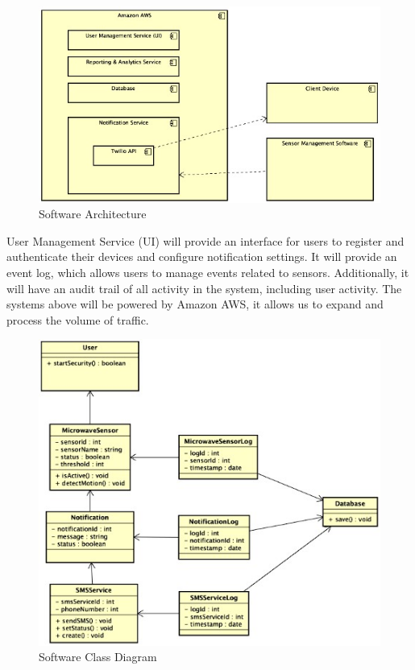 \documentclass[conference]{IEEEtran}
\begin{document}
\begin{figure}[htbp]
      \centering
      \includegraphics[width=0.8\linewidth]{softwareArchitecture}
      \caption{Software Architecture}
      \label{fig:softwareArchitecture}
\end{figure}

User Management Service (UI) will provide an interface for users to register and
authenticate their devices and configure notification settings. It will provide an
event log, which allows users to manage events related to sensors. Additionally, it
will have an audit trail of all activity in the system, including user activity.
The systems above will be powered by Amazon AWS, it allows us to expand and process
the volume of traffic.

\begin{figure}[htbp]
      \centering
      \includegraphics[width=0.8\linewidth]{softwareClassDiagram.jpg}
      \caption{Software Class Diagram}
      \label{fig:softwareClassDiagram}
\end{figure}
\end{document}
